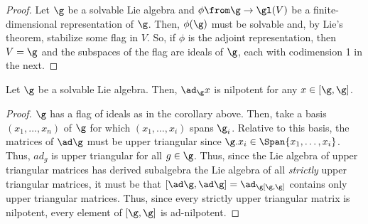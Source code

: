 \documentclass[11pt,leqno,oneside]{amsart}
\numberwithin{thm}{section}
\begin{document}
\begin{proof}
  Let \(\g\) be a solvable Lie algebra and \(\phi \from \g \to
  \gl(V)\) be a finite-dimensional representation of \(\g\). Then,
  \(\phi(\g)\) must be solvable and, by Lie's theorem, stabilize some
  flag in \(V\). So, if \(\phi\) is the adjoint representation, then
  \(V = \g\) and the subspaces of the flag are ideals of \(\g\), each with
  codimension 1 in the next.
\end{proof}
\begin{cor}
  Let \(\g\) be a solvable Lie algebra. Then, \(\ad_\g x\) is
  nilpotent for any \(x \in [\g,\g]\). 
\end{cor}
\begin{proof}
  \(\g\) has a flag of ideals as in the corollary above. Then, take a
  basis \((x_1, \ldots, x_n)\) of \(\g\) for which \((x_1, \ldots,
  x_i)\) spans \(\g_i\). Relative to this basis, the matrices of \(\ad
  \g\) must be upper triangular since \(\g.x_i \in \Span \{x_1,
  \ldots, x_i\}\). Thus, \(ad_g\) is upper triangular for all \(g \in
  \g\). Thus, since the Lie algebra of upper triangular matrices has
  derived subalgebra the Lie algebra of all \emph{strictly} upper
  triangular matrices, it must be that \([\ad \g, \ad \g] = \ad_\g [\g,\g]\) contains
  only upper triangular matrices. Thus, since every strictly upper
  triangular matrix is nilpotent, every element of \([\g,\g]\) is
  ad-nilpotent. 
\end{proof}
\end{document}

